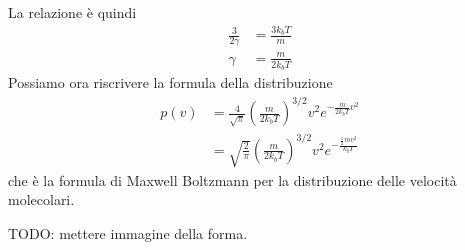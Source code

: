 \documentclass[a4paper]{article}
\begin{document}
La relazione è quindi
\begin{align*}
    \frac{3}{2\gamma} &= \frac{3k_b T}{m} \\
    \gamma &= \frac{m}{2k_bT}
\end{align*}
Possiamo ora riscrivere la formula della distribuzione
\begin{align*}
    p(v) &= \frac{4}{\sqrt{\pi}} {\left(\frac{m}{2k_bT}\right)}^{3/2} v^2 e^{-\frac{m}{2k_b T} v^2} \\
    &= \sqrt{\frac{2}{\pi}}{\left(\frac{m}{2k_bT}\right)}^{3/2} v^2 e^{-\frac{\frac{1}{2}mv^2}{k_bT}}
\end{align*}
che è la formula di Maxwell Boltzmann per la distribuzione delle velocità molecolari.

TODO: mettere immagine della forma.
\end{document}
